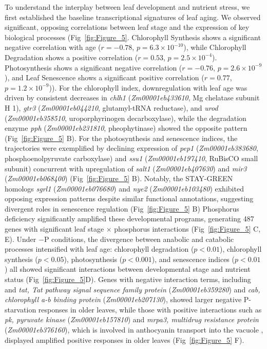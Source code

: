 \documentclass[9pt,twocolumn,twoside]{rilabRxiv}
\begin{document}
To understand the interplay between leaf development and nutrient stress, we first established the baseline transcriptional signatures of leaf aging.
We observed significant, opposing correlations between leaf stage and the expression of key biological processes (Fig~\ref{fig:Figure_5}.
Chlorophyll Synthesis shows a significant negative correlation with age
($r = -0.78$, $p = 6.3\times 10^{-10}$), while Chlorophyll Degradation shows a positive correlation ($r = 0.53$, $p = 2.5\times 10^{-4}$). 
Photosynthesis shows a significant negative correlation ($r = -0.76$, $p = 2.6\times 10^{-9}$), and Leaf Senescence shows a significant positive correlation ($r = 0.77$, $p = 1.2\times 10^{-9}$)). 
For the chlorophyll index, downregulation with leaf age was driven by consistent decreases in \textit{chlh1} (\textit{Zm00001eb433610}, Mg chelatase subunit H 1), \textit{gtr3} (\textit{Zm00001eb044210}, glutamyl-tRNA reductase), and \textit{urod} (\textit{Zm00001eb358510}, uroporphyrinogen decarboxylase), while the degradation enzyme \textit{pph} (\textit{Zm00001eb231810}, pheophytinase) showed the opposite pattern (Fig~\ref{fig:Figure_5} B).
For the photosynthesis and senescence indices, the trajectories were exemplified by declining expression of \textit{pep1} (\textit{Zm00001eb383680}, phosphoenolpyruvate carboxylase) and \textit{ssu1} (\textit{Zm00001eb197410}, RuBisCO small subunit) concurrent with upregulation of \textit{salt1} (\textit{Zm00001eb407630}) and \textit{mir3} (\textit{Zm00001eb068400}) (Fig~\ref{fig:Figure_5} B).
Notably, the STAY-GREEN homologs \textit{sgrl1} (\textit{Zm00001eb076680}) and \textit{nye2} (\textit{Zm00001eb103480}) exhibited opposing expression patterns despite similar functional annotations, suggesting divergent roles in senescence regulation (Fig~\ref{fig:Figure_5} B) Phosphorus deficiency significantly amplified these developmental programs, generating 487 genes with significant leaf stage $\times$ phosphorus interactions (Fig~\ref{fig:Figure_5} C, E).
Under $-$P conditions, the divergence between anabolic and catabolic processes intensified with leaf age: chlorophyll degradation ($p < 0.01$), chlorophyll synthesis ($p < 0.05$), photosynthesis ($p < 0.001$), and senescence indices ($p < 0.01$) all showed significant interactions between developmental stage and nutrient status (Fig~\ref{fig:Figure_5}D).
Genes with negative interaction terms, including and \textit{tat, Tat pathway signal sequence family protein} (\textit{Zm00001eb359280}) and \textit{cab, chlorophyll a-b binding protein} (\textit{Zm00001eb207130}), showed larger negative P-starvation responses in older leaves, while those with positive interactions such as \textit{pk, pyruvate kinase} (\textit{Zm00001eb157810}) and \textit{mrpa3, multidrug resistance protein} (\textit{Zm00001eb376160}), which is involved in anthocyanin transport into the vacuole \cite{goodman2004},  displayed amplified positive responses in older leaves (Fig~\ref{fig:Figure_5} F).
\end{document}

